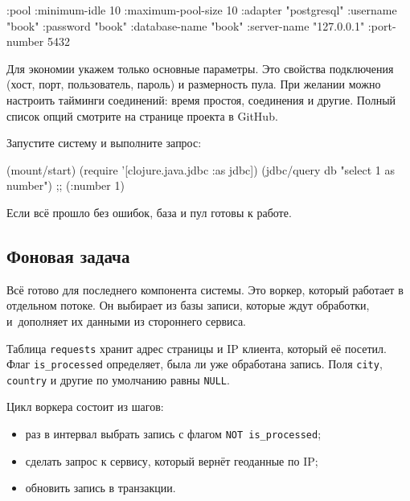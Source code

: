 \begin{english}
  \begin{clojure}
{:pool {:minimum-idle       10
        :maximum-pool-size  10
        :adapter            "postgresql"
        :username           "book"
        :password           "book"
        :database-name      "book"
        :server-name        "127.0.0.1"
        :port-number        5432}}
  \end{clojure}
\end{english}

Для экономии укажем только основные параметры. Это свойства подключения (хост,
порт, пользователь, пароль) и размерность пула. При желании можно настроить
тайминги соединений: время простоя, соединения и другие. Полный список опций
смотрите на странице проекта в GitHub.

Запустите систему и выполните запрос:

\begin{english}
  \begin{clojure}
(mount/start)
(require '[clojure.java.jdbc :as jdbc])
(jdbc/query db "select 1 as number")
;; ({:number 1})
  \end{clojure}
\end{english}

Если всё прошло без ошибок, база и пул готовы к работе.

\subsection{Фоновая задача}

\label{worker}

Всё готово для последнего компонента системы. Это воркер, который работает в
отдельном потоке. Он выбирает из базы записи, которые ждут обработки,
и~дополняет их данными из стороннего сервиса.

Таблица \verb|requests| хранит адрес страницы и IP клиента, который её
посетил. Флаг \verb|is_processed| определяет, была ли уже обработана
запись. Поля \verb|city|, \verb|country| и другие по умолчанию равны
\verb|NULL|.


Цикл воркера состоит из шагов:

\begin{itemize}

\item
  раз в интервал выбрать запись с флагом \verb|NOT is_processed|;

\item
  сделать запрос к сервису, который вернёт геоданные по IP;

\item
  обновить запись в транзакции.

\end{itemize}

